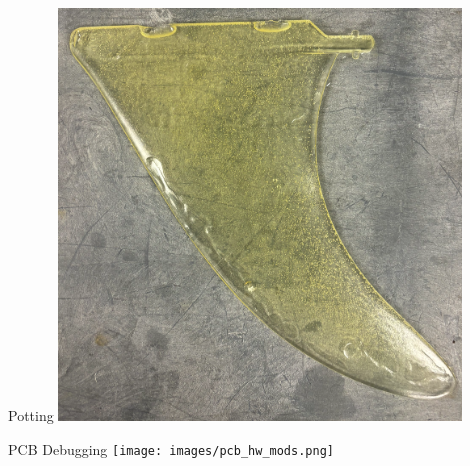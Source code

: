 \begin{frame}{Potting}
    \centering
    \includegraphics[height=0.8\textheight,width=0.8\textwidth,keepaspectratio]{images/Epoxy_fin.png}
\end{frame}
\begin{frame}{PCB Debugging}
    \centering
    \texttt{[image: images/pcb\_hw\_mods.png]}
\end{frame}
